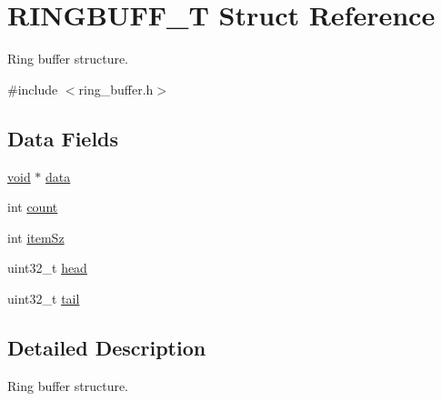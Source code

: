 \hypertarget{structRINGBUFF__T}{\section{R\-I\-N\-G\-B\-U\-F\-F\-\_\-\-T Struct Reference}
\label{structRINGBUFF__T}
}


Ring buffer structure.  




{\ttfamily \#include $<$ring\-\_\-buffer.\-h$>$}

\subsection*{Data Fields}
\begin{DoxyCompactItemize}
\item 
\hyperlink{Paradigm_2Tern__EE_2small_2portmacro_8h_a14d32f8130d3c0b212cfc751730b5b49}{void} $\ast$ \hyperlink{structRINGBUFF__T_a72858dc34b0dd618118388924c28967c}{data}
\item 
int \hyperlink{structRINGBUFF__T_a87af72a615ed11d5c7000904a2fe5b4a}{count}
\item 
int \hyperlink{structRINGBUFF__T_a8d36d35edc73f36f7f81e98693ef3259}{item\-Sz}
\item 
uint32\-\_\-t \hyperlink{structRINGBUFF__T_a30c2ea59e510513e18bb22b4c783e6bb}{head}
\item 
uint32\-\_\-t \hyperlink{structRINGBUFF__T_a490ce2de2b2e234beeafdb9f9298f20f}{tail}
\end{DoxyCompactItemize}


\subsection{Detailed Description}
Ring buffer structure. 

